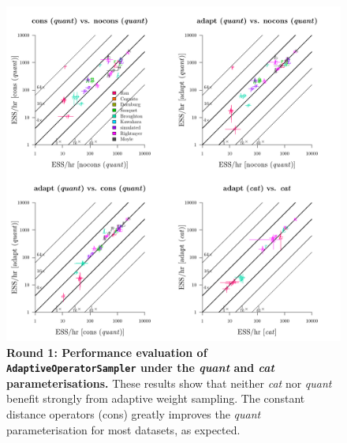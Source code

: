 \documentclass[12pt]{article}
\begin{document}
\begin{figure}[!htb]
\includegraphics[width=\textwidth]{benchmarking/benchmarkingVM/ESS_round1_catquant.pdf}
\caption{\textbf{Round 1: Performance evaluation of \texttt{AdaptiveOperatorSampler} under the \emph{quant} and \emph{cat} parameterisations.}
These results show that neither \emph{cat} nor \emph{quant} benefit strongly from adaptive weight sampling. The constant distance operators (cons) greatly improves the \emph{quant} parameterisation for most datasets, as expected. }
\end{figure}





%
\end{document}
